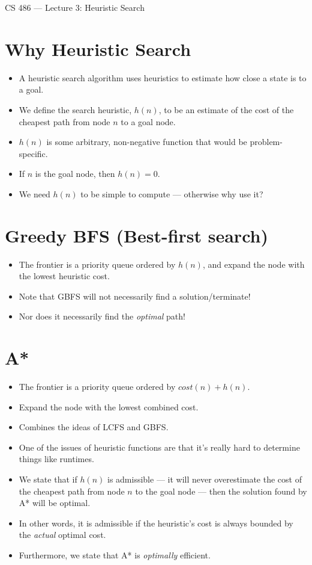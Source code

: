 \documentclass{article}
\author{Clement Tsang}
\begin{document}
\begin{center}
    \Large{CS 486 --- Lecture 3: Heuristic Search}
\end{center}

\section{Why Heuristic Search}
\begin{itemize}
    \item A heuristic search algorithm uses heuristics to estimate how close a state is to a goal.
    \item We define the search heuristic, $h(n)$, to be an estimate of the cost of the cheapest path from node $n$ to a goal node.
    \item $h(n)$ is some arbitrary, non-negative function that would be problem-specific.
    \item If $n$ is the goal node, then $h(n) = 0$.
    \item We need $h(n)$ to be simple to compute --- otherwise why use it?
\end{itemize}

\section{Greedy BFS (Best-first search)}
\begin{itemize}
    \item The frontier is a priority queue ordered by $h(n)$, and expand the node with the lowest heuristic cost.
    \item Note that GBFS will not necessarily find a solution/terminate!
    \item Nor does it necessarily find the \emph{optimal} path! 
\end{itemize}

\section{A*}
\begin{itemize}
    \item The frontier is a priority queue ordered by $cost(n) + h(n)$.
    \item Expand the node with the lowest combined cost.
    \item Combines the ideas of LCFS and GBFS.
    \item One of the issues of heuristic functions are that it's really hard to determine things like runtimes.
    \item We state that if $h(n)$ is admissible --- it will never overestimate the cost of the cheapest path from node $n$ to the goal node --- then the solution found by A* will be optimal.
    \item In other words, it is admissible if the heuristic's cost is always bounded by the \emph{actual} optimal cost.
    \item Furthermore, we state that A* is \emph{optimally} efficient.
\end{itemize}
\end{document}
